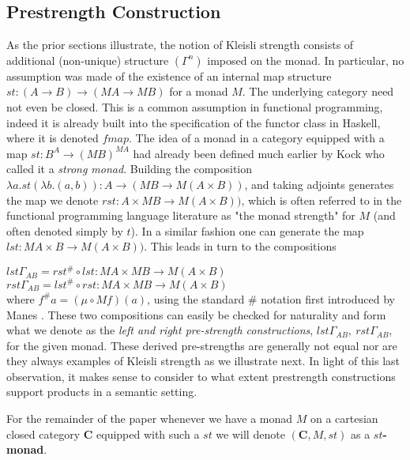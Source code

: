 \documentclass[submission,copyright]{eptcs}
\begin{document}
\subsection{Prestrength Construction}

As the prior sections illustrate, the notion of Kleisli strength consists of additional (non-unique) structure $(\Gamma^n)$ imposed on the monad. In particular, no assumption was made of the existence of an internal map structure $st:(A \rightarrow B) \rightarrow (MA \rightarrow MB)$ for a monad $M$. The underlying category need not even be closed. This is a common assumption in functional programming, indeed it is already built into the specification of the functor class in Haskell, where it is denoted $fmap$. The idea of a monad in a category equipped with a map $st:B^A \rightarrow (MB)^{MA}$ had already been defined much earlier by Kock \cite{articleB} who called it a {\it strong monad}. Building the composition $\lambda a. st(\lambda b.(a,b)): A \rightarrow (MB \rightarrow M(A \times B))$, and taking adjoints generates the map we denote $rst:A \times MB \rightarrow M(A \times B))$, which is often referred to in the functional programming language literature as "the monad strength" for $M$ (and often denoted simply by $t$). In a similar fashion one can generate the map $lst:MA \times B \rightarrow M(A \times B))$. This leads in turn to the compositions

\medskip
$lst\Gamma_{AB}= rst^{\#} \circ lst: MA \times MB \rightarrow M(A \times B)$\\

$rst\Gamma_{AB}= lst^{\#} \circ rst: MA \times MB \rightarrow M(A \times B)$\\

\noindent where $f^{\#} a = (\mu \circ Mf)(a)$, using the standard ${\#}$ notation first introduced by Manes \cite{bookA}. These two compositions can easily be checked for naturality and form what we denote as the {\it left and right pre-strength constructions}, $lst\Gamma_{AB}, ~rst\Gamma_{AB}$, for the given monad.  These derived pre-strengths are generally not equal nor are they always examples of Kleisli strength as we illustrate next. In light of this last observation, it makes sense to consider to what extent prestrength constructions support products in a semantic setting. 



\medskip
For the remainder of the paper whenever we have a monad $M$ on a cartesian closed category $\textbf{C}$ equipped with such a $st$ we will denote $(\textbf{C},M,st)$ as a {\bf $st$-monad}. 
\end{document}
